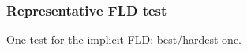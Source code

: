 \subsubsection{Representative FLD test}
\label{sec.tests.fld}

One test for the implicit FLD: best/hardest one.
